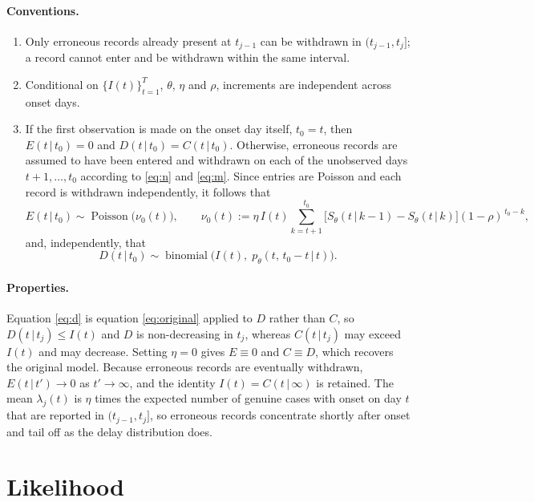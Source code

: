 \documentclass[11pt,a4paper]{article}
\newcommand{\given}{\,|\,}
\newcommand{\bin}{\operatorname{binomial}}
\newcommand{\pois}{\operatorname{Poisson}}
\begin{document}
\paragraph{Conventions.}
\begin{enumerate}[label=(\roman*),itemsep=2pt]
\item Only erroneous records already present at $t_{j-1}$ can be withdrawn in
$(t_{j-1},t_j]$; a record cannot enter and be withdrawn within the same
interval.
\item Conditional on $\{I(t)\}_{t=1}^T$, $\theta$, $\eta$ and $\rho$,
increments are independent across onset days.
\item If the first observation is made on the onset day itself, $t_0=t$, then
$E(t\given t_0)=0$ and $D(t\given t_0)=C(t\given t_0)$. Otherwise, erroneous
records are assumed to have been entered and withdrawn on each of the
unobserved days $t+1,\dots,t_0$ according to \eqref{eq:n} and \eqref{eq:m}.
Since entries are Poisson and each record is withdrawn independently, it
follows that
\begin{equation}\label{eq:initialE}
E(t\given t_0)\sim\pois\bigl(\nu_0(t)\bigr),\qquad
\nu_0(t) := \eta\,I(t)\sum_{k=t+1}^{t_0}
\bigl[S_\theta(t\given k-1)-S_\theta(t\given k)\bigr](1-\rho)^{\,t_0-k},
\end{equation}
and, independently, that
\begin{equation}\label{eq:initialD}
D(t\given t_0)\sim\bin\bigl(I(t),\;p_\theta(t,\,t_0-t\given t)\bigr).
\end{equation}
\end{enumerate}

\paragraph{Properties.}
Equation \eqref{eq:d} is equation \eqref{eq:original} applied to $D$ rather
than $C$, so $D(t\given t_j)\le I(t)$ and $D$ is non-decreasing in $t_j$,
whereas $C(t\given t_j)$ may exceed $I(t)$ and may decrease. Setting $\eta=0$
gives $E\equiv 0$ and $C\equiv D$, which recovers the original model. Because
erroneous records are eventually withdrawn, $E(t\given t')\to 0$ as
$t'\to\infty$, and the identity $I(t)=C(t\given\infty)$ is retained. The mean
$\lambda_j(t)$ is $\eta$ times the expected number of genuine cases with onset
on day $t$ that are reported in $(t_{j-1},t_j]$, so erroneous records
concentrate shortly after onset and tail off as the delay distribution does.

\section{Likelihood}
\end{document}
